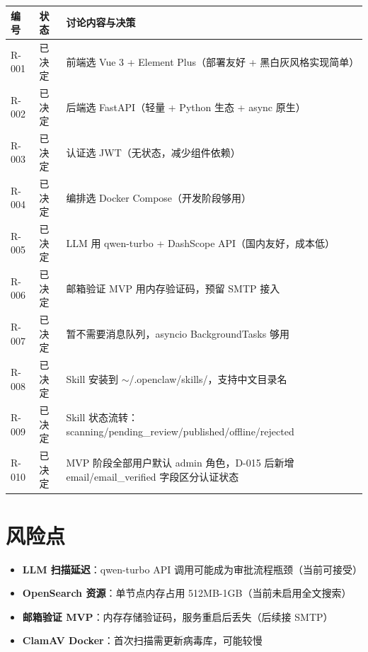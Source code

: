 \documentclass[11pt,a4paper]{article}
\begin{document}
\begin{table}[h]
\centering
\begin{tabularx}{\linewidth}{lp{2cm}X}
\toprule
\textbf{编号} & \textbf{状态} & \textbf{讨论内容与决策} \\
\midrule
R-001 & \textcolor{success}{已决定} & 前端选 Vue 3 + Element Plus（部署友好 + 黑白灰风格实现简单） \\
R-002 & \textcolor{success}{已决定} & 后端选 FastAPI（轻量 + Python 生态 + async 原生） \\
R-003 & \textcolor{success}{已决定} & 认证选 JWT（无状态，减少组件依赖） \\
R-004 & \textcolor{success}{已决定} & 编排选 Docker Compose（开发阶段够用） \\
R-005 & \textcolor{success}{已决定} & LLM 用 qwen-turbo + DashScope API（国内友好，成本低） \\
R-006 & \textcolor{success}{已决定} & 邮箱验证 MVP 用内存验证码，预留 SMTP 接入 \\
R-007 & \textcolor{success}{已决定} & 暂不需要消息队列，asyncio BackgroundTasks 够用 \\
R-008 & \textcolor{success}{已决定} & Skill 安装到 $\sim$/.openclaw/skills/，支持中文目录名 \\
R-009 & \textcolor{success}{已决定} & Skill 状态流转：scanning/pending\_review/published/offline/rejected \\
R-010 & \textcolor{success}{已决定} & MVP 阶段全部用户默认 admin 角色，D-015 后新增 email/email\_verified 字段区分认证状态 \\
\bottomrule
\end{tabularx}
\end{table}

\section{风险点}

\begin{itemize}[nosep]
  \item \textbf{LLM 扫描延迟}：qwen-turbo API 调用可能成为审批流程瓶颈（当前可接受）
  \item \textbf{OpenSearch 资源}：单节点内存占用 512MB-1GB（当前未启用全文搜索）
  \item \textbf{邮箱验证 MVP}：内存存储验证码，服务重启后丢失（后续接 SMTP）
  \item \textbf{ClamAV Docker}：首次扫描需更新病毒库，可能较慢
\end{itemize}
\end{document}
